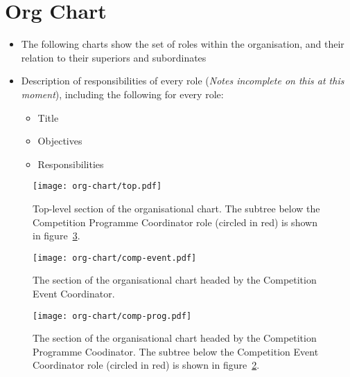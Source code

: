 \section{Org Chart}

\begin{itemize}
\item The following charts show the set of roles within the organisation, and their relation to their superiors and subordinates
\item Description of responsibilities of every role (\textit{Notes incomplete on this at this moment}), including the following for every role:
  \begin{itemize}
  \item Title
  \item Objectives
  \item Responsibilities
  \end{itemize}
\end{itemize}

\begin{landscape}
  \begin{figure}
    \begin{center}
      \texttt{[image: org-chart/top.pdf]}
    \end{center}
    \caption{\label{fig:org-chart-top}Top-level section of the organisational chart.  The subtree below the Competition Programme Coordinator role (circled in red) is shown in figure~\ref{fig:org-chart-prog}.}
  \end{figure}
\end{landscape}

\begin{landscape}
  \begin{figure}
    \begin{center}
      \texttt{[image: org-chart/comp-event.pdf]}
    \end{center}
    \caption{\label{fig:org-chart-event}The section of the organisational chart headed by the Competition Event Coordinator.}
  \end{figure}
\end{landscape}

\begin{landscape}
  \begin{figure}
    \begin{center}
      \texttt{[image: org-chart/comp-prog.pdf]}
    \end{center}
    \caption{\label{fig:org-chart-prog}The section of the organisational chart headed by the Competition Programme Coodinator.  The subtree below the Competition Event Coordinator role (circled in red) is shown in figure~\ref{fig:org-chart-event}.}
  \end{figure}
\end{landscape}

